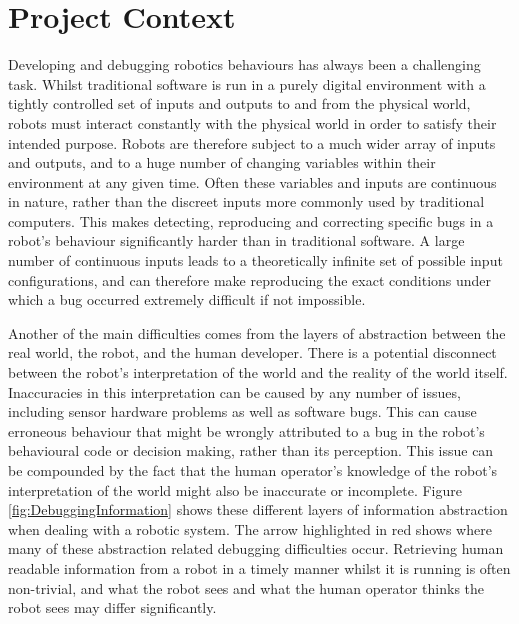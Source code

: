 
\section{Project Context} \label{ProjectContext}
Developing and debugging robotics behaviours has always been a challenging task. Whilst traditional software is run in a purely digital environment with a tightly controlled set of inputs and outputs to and from the physical world, robots must interact constantly with the physical world in order to satisfy their intended purpose. Robots are therefore subject to a much wider array of inputs and outputs, and to a huge number of changing variables within their environment at any given time. Often these variables and inputs are continuous in nature, rather than the discreet inputs more commonly used by traditional computers. This makes detecting, reproducing and correcting specific bugs in a robot's behaviour significantly harder than in traditional software. A large number of continuous inputs leads to a theoretically infinite set of possible input configurations, and can therefore make reproducing the exact conditions under which a bug occurred extremely difficult if not impossible. 

Another of the main difficulties comes from the layers of abstraction between the real world, the robot, and the human developer. There is a potential disconnect between the robot's interpretation of the world and the reality of the world itself. Inaccuracies in this interpretation can be caused by any number of issues, including sensor hardware problems as well as software bugs. This can cause erroneous behaviour that might be wrongly attributed to a bug in the robot's behavioural code or decision making, rather than its perception. This issue can be compounded by the fact that the human operator's knowledge of the robot's interpretation of the world might also be inaccurate or incomplete. Figure \ref{fig:DebuggingInformation} shows these different layers of information abstraction when dealing with a robotic system. The arrow highlighted in red shows where many of these abstraction related debugging difficulties occur. Retrieving human readable information from a robot in a timely manner whilst it is running is often non-trivial, and what the robot sees and what the human operator thinks the robot sees may differ significantly.

